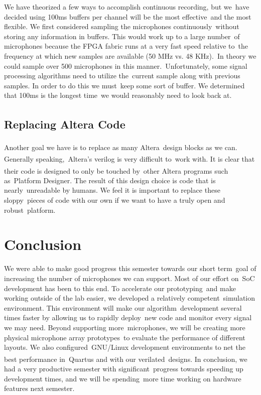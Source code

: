 \documentclass{article}
\begin{document}
We have theorized a few ways to accomplish continuous recording, but we\
have decided using 100ms buffers per channel will be the most effective\
and the most flexible. We first considered sampling the microphones continuously\
without storing any information in buffers. This would work up to a large number\
of microphones because the FPGA fabric runs at a very fast speed relative to\
the frequency at which new samples are available (50 MHz vs. 48 KHz).\
In theory we could sample over 500 microphones in this manner.\
Unfortunately, some signal processing algorithms need to utilize the\
current sample along with previous samples. In order to do this we must\
keep some sort of buffer. We determined that 100ms is the longest time\
we would reasonably need to look back at.

\subsection{Replacing Altera\textsuperscript{\textregistered{}} Code}
Another goal we have is to replace as many Altera\textsuperscript{\textregistered{}}\
design blocks as we can. Generally speaking,\
Altera\textsuperscript{\textregistered{}}'s verilog is very difficult to\
work with. It is clear that their code is designed to only be touched by\
other Altera\textsuperscript{\textregistered{}} programs such as\
Platform Designer. The result of this design choice is code that is nearly\
unreadable by humans. We feel it is important to replace these sloppy\
pieces of code with our own if we want to have a truly open and robust\
platform.

\section{Conclusion}
We were able to make good progress this semester towards our short term\
goal of increasing the number of microphones we can support. Most of our effort on\
SoC development has been to this end. To accelerate our prototyping\
and make working outside of the lab easier, we developed a relatively competent\
simulation environment. This environment will make our algorithm\
development several times faster by allowing us to rapidly deploy\
new code and monitor every signal we may need. Beyond supporting more\
microphones, we will be creating more physical microphone array prototypes\
to evaluate the performance of different layouts. We also configured\
GNU/Linux development environments to net the best performance in\
Quartus\textsuperscript{\textregistered{}} and with our verilated\
designs. In conclusion, we had a very productive semester with significant\
progress towards speeding up development times, and we will be spending\
more time working on hardware features next semester.

\printbibliography
\end{document}
